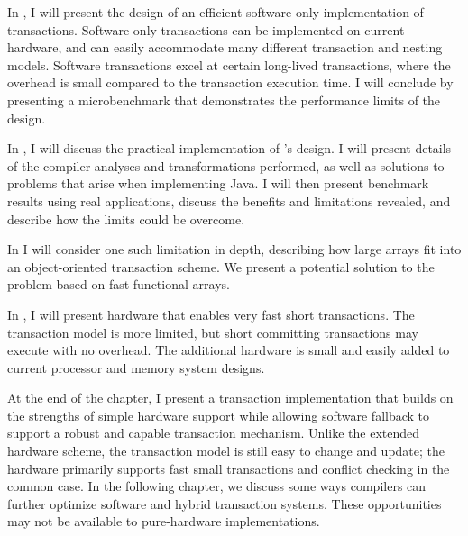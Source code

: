 In , I will present the design of an efficient software-only
implementation of transactions.  Software-only transactions can be
implemented on current hardware, and can easily accommodate many
different transaction and nesting models.  Software transactions excel
at certain long-lived transactions, where the overhead is
small compared to the transaction execution time.  I will conclude by
presenting a microbenchmark that demonstrates the performance limits of
the design.

In , I will discuss the practical implementation of
's design.  I will present details of the compiler
analyses and transformations performed, as well as solutions to
problems that arise when implementing Java.  I will then present
benchmark results using real applications, discuss the benefits and
limitations revealed, and describe how the limits could be overcome.

In  I will consider one such limitation in depth,
describing how large arrays fit into an object-oriented transaction
scheme.  We present a potential solution to the problem based on
fast functional arrays.

In , I will present hardware that enables very fast
short transactions.  The transaction model is more limited, but short
committing transactions may execute with no overhead.  The additional
hardware is small and easily added to current processor and memory
system designs.


At the end of the chapter,
I present a  transaction implementation
that builds on the strengths of simple hardware support while
allowing software fallback to support a robust and capable transaction
mechanism.  Unlike the extended hardware scheme, the transaction model
is still easy to change and update; the hardware primarily supports
fast small transactions and conflict checking in the common case.
In the following chapter, we discuss some ways compilers can further
optimize software and hybrid transaction systems.  These opportunities
may not be available to pure-hardware implementations.

